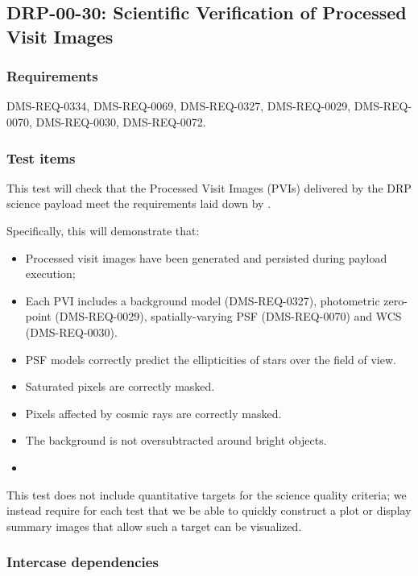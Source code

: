 \subsection{DRP-00-30: Scientific Verification of Processed Visit Images}
\label{drp-00-30}

\subsubsection{Requirements}

DMS-REQ-0334, DMS-REQ-0069, DMS-REQ-0327, DMS-REQ-0029, DMS-REQ-0070,
DMS-REQ-0030, DMS-REQ-0072.

\subsubsection{Test items}
\label{drp-00-30-items}

This test will check that the Processed Visit Images (PVIs) delivered by the
DRP science payload meet the requirements laid down by .

Specifically, this will demonstrate that:

\begin{itemize}

  \item{Processed visit images have been generated and persisted during
  payload execution;}
  \item{Each PVI includes a background model (DMS-REQ-0327), photometric
  zero-point (DMS-REQ-0029), spatially-varying PSF (DMS-REQ-0070) and WCS
  (DMS-REQ-0030).}
  \item{PSF models correctly predict the ellipticities of stars over the field of view.}
  \item{Saturated pixels are correctly masked.}
  \item{Pixels affected by cosmic rays are correctly masked.}
  \item{The background is not oversubtracted around bright objects.}
  \item

\end{itemize}

This test does not include quantitative targets for the science quality criteria; we instead require for each test that we be able to quickly construct a plot or display summary images that allow such a target can be visualized.

\subsubsection{Intercase dependencies}

